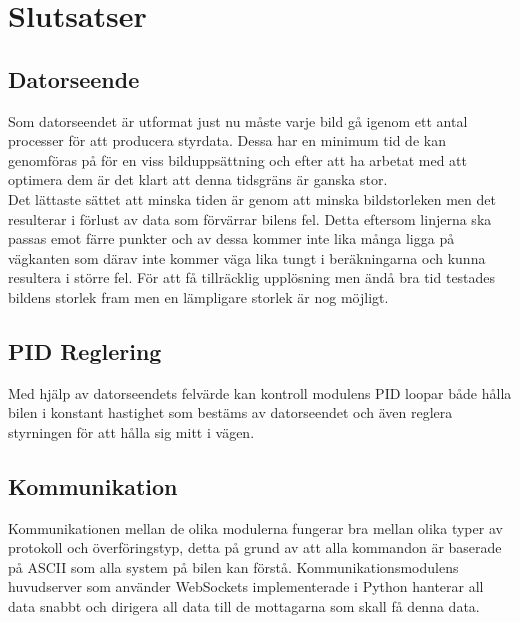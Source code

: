 \documentclass[10pt,oneside,swedish]{lips}
\begin{document}
\pagebreak
\section{Slutsatser}

\subsection{Datorseende}
Som datorseendet är utformat just nu måste varje bild gå igenom ett antal processer för att producera styrdata. Dessa har en minimum tid de kan genomföras på för en viss bilduppsättning och efter att ha arbetat med att optimera dem är det klart att denna tidsgräns är ganska stor. \\

\noindent
Det lättaste sättet att minska tiden är genom att minska bildstorleken men det resulterar i förlust av data som förvärrar bilens fel. Detta eftersom linjerna ska passas emot färre punkter och av dessa kommer inte lika många ligga på vägkanten som därav inte kommer väga lika tungt i beräkningarna och kunna resultera i större fel. För att få tillräcklig upplösning men ändå bra tid testades bildens storlek fram men en lämpligare storlek är nog möjligt.

\subsection{PID Reglering}
Med hjälp av datorseendets felvärde kan kontroll modulens PID loopar både hålla bilen i konstant hastighet som bestäms av datorseendet och även reglera styrningen för att hålla sig mitt i vägen.

\subsection{Kommunikation}
Kommunikationen mellan de olika modulerna fungerar bra mellan olika typer av protokoll och överföringstyp, detta på grund av att alla kommandon är baserade på ASCII som alla system på bilen kan förstå. Kommunikationsmodulens huvudserver som använder WebSockets implementerade i Python hanterar all data snabbt och dirigera all data till de mottagarna som skall få denna data.


\clearpage

\clearpage

\appendix
\end{document}
